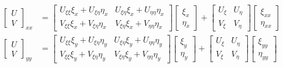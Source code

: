 \documentclass[final,1p,times]{elsarticle}
\begin{document}
\begin{subequations}
\begin{align}
\begin{bmatrix} U \\ V \end{bmatrix}_{xx}	&= \begin{bmatrix} U_{\xi\xi}\xi_x+U_{\xi\eta}\eta_x & U_{\xi\eta}\xi_x+U_{\eta\eta}\eta_x \\ V_{\xi\xi}\xi_x+V_{\xi\eta}\eta_x & V_{\xi\eta}\xi_x+V_{\eta\eta}\eta_x \end{bmatrix}\begin{bmatrix}\xi_x \\ \eta_x \end{bmatrix} + \begin{bmatrix} U_{\xi} & U_{\eta} \\ V_{\xi} & V_{\eta} \end{bmatrix}\begin{bmatrix}\xi_{xx} \\ \eta_{xx} \end{bmatrix} \\
\begin{bmatrix} U \\ V \end{bmatrix}_{yy}	&= \begin{bmatrix} U_{\xi\xi}\xi_y+U_{\xi\eta}\eta_y & U_{\xi\eta}\xi_y+U_{\eta\eta}\eta_y \\ V_{\xi\xi}\xi_y+V_{\xi\eta}\eta_y & V_{\xi\eta}\xi_y+V_{\eta\eta}\eta_y \end{bmatrix}\begin{bmatrix}\xi_y \\ \eta_y \end{bmatrix} + \begin{bmatrix} U_{\xi} & U_{\eta} \\ V_{\xi} & V_{\eta} \end{bmatrix}\begin{bmatrix}\xi_{yy} \\ \eta_{yy} \end{bmatrix}
\end{align}
\end{subequations}
\end{document}
